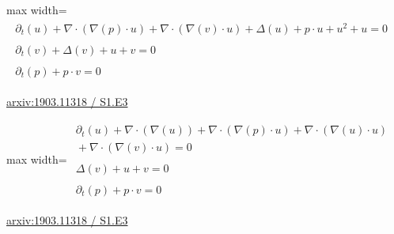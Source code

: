 \documentclass[UTF8,10pt,a4paper,fontset=mac]{ctexart}
\begin{document}
\begin{minipage}{\linewidth}\begin{center}\begin{adjustbox}{max width=\linewidth}$\displaystyle\begin{gathered}\begin{gathered}\partial_{t}(u)+\nabla\cdot(\nabla(p)\cdot u)+\nabla\cdot(\nabla(v)\cdot u)+\Delta(u)+p\cdot u+u^{2}+u=0\end{gathered}\\[5pt]\begin{gathered}\partial_{t}(v)+\Delta(v)+u+v=0\end{gathered}\\[5pt]\begin{gathered}\partial_{t}(p)+p\cdot v=0\end{gathered}\end{gathered}$\end{adjustbox}\end{center}{\small\href{https://arxiv.org/html/1903.11318#S1.E3}{arxiv:1903.11318 / S1.E3}}\par\end{minipage}\par\vspace{6mm}

\begin{minipage}{\linewidth}\begin{center}\begin{adjustbox}{max width=\linewidth}$\displaystyle\begin{gathered}\begin{gathered}\partial_{t}(u)+\nabla\cdot(\nabla(u))+\nabla\cdot(\nabla(p)\cdot u)+\nabla\cdot(\nabla(u)\cdot u)\\[-1pt]{}+\nabla\cdot(\nabla(v)\cdot u)=0\end{gathered}\\[5pt]\begin{gathered}\Delta(v)+u+v=0\end{gathered}\\[5pt]\begin{gathered}\partial_{t}(p)+p\cdot v=0\end{gathered}\end{gathered}$\end{adjustbox}\end{center}{\small\href{https://arxiv.org/html/1903.11318#S1.E3}{arxiv:1903.11318 / S1.E3}}\par\end{minipage}\par\vspace{6mm}
\end{document}
